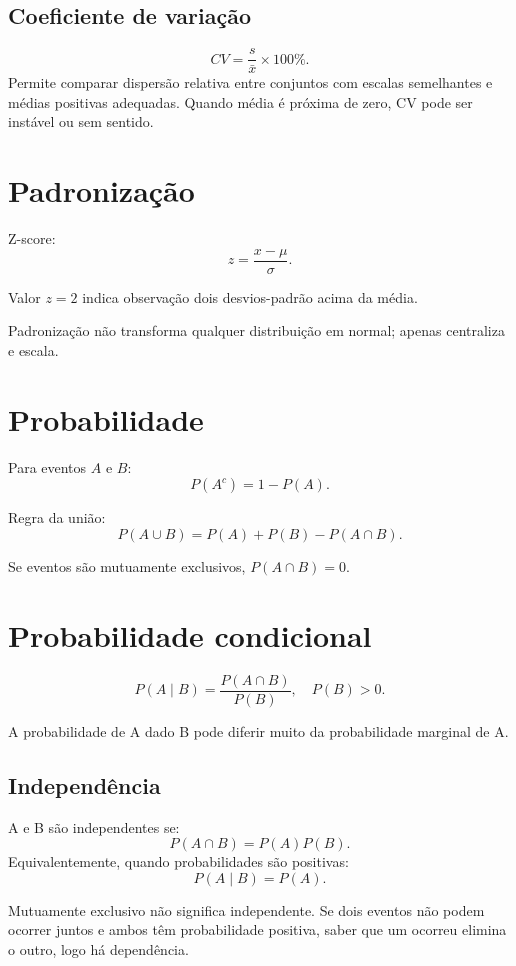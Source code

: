 \subsection{Coeficiente de variação}

\[
CV=\frac{s}{\bar{x}}\times100\%.
\]
Permite comparar dispersão relativa entre conjuntos com escalas semelhantes e médias positivas adequadas. Quando média é próxima de zero, CV pode ser instável ou sem sentido.

\section{Padronização}

Z-score:
\[
z=\frac{x-\mu}{\sigma}.
\]

Valor $z=2$ indica observação dois desvios-padrão acima da média.

Padronização não transforma qualquer distribuição em normal; apenas centraliza e escala.

\section{Probabilidade}

Para eventos $A$ e $B$:
\[
P(A^c)=1-P(A).
\]

Regra da união:
\[
P(A\cup B)=P(A)+P(B)-P(A\cap B).
\]

Se eventos são mutuamente exclusivos, $P(A\cap B)=0$.

\section{Probabilidade condicional}

\[
P(A\mid B)=\frac{P(A\cap B)}{P(B)},\quad P(B)>0.
\]

A probabilidade de A dado B pode diferir muito da probabilidade marginal de A.

\subsection{Independência}

A e B são independentes se:
\[
P(A\cap B)=P(A)P(B).
\]
Equivalentemente, quando probabilidades são positivas:
\[
P(A\mid B)=P(A).
\]

Mutuamente exclusivo não significa independente. Se dois eventos não podem ocorrer juntos e ambos têm probabilidade positiva, saber que um ocorreu elimina o outro, logo há dependência.

